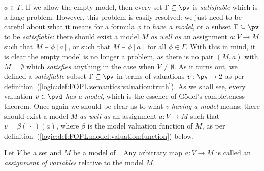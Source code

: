 $\phi\in\Gamma$. If we allow the empty model, then every set
$\Gamma\subseteq\pv$ is {\em satisfiable} which is a huge problem.
However, this problem is easily resolved: we just need to be careful
about what it means for a formula $\phi$ to {\em have a model}, or a
subset $\Gamma\subseteq\pv$ to be {\em satisfiable}: there should
exist a model $M$ {\em as well as } an assignment $a:V\to M$ such
that $M\vDash\phi[a]$, or such that $M\vDash\phi[a]$ for all
$\phi\in\Gamma$. With this in mind, it is clear the empty model is
no longer a problem, as there is no pair $(M,a)$ with $M=\emptyset$
which {\em satisfies} anything in the case when $V\neq\emptyset$. As
it turns out, we defined a {\em satisfiable} subset
$\Gamma\subseteq\pv$ in terms of valuations $v:\pv\to 2$ as per
definition~(\ref{logic:def:FOPL:semantics:valuation:truth}). As we
shall see, every valuation $v\in\pvd$ {\em has a model}, which is
the essence of G\"odel's completeness theorem. Once again we should
be clear as to what $v$ {\em having a model} means: there should
exist a model $M$ {\em as well as} an assignment $a:V\to M$ such
that $v=\beta(\,\cdot\,)(a)$, where $\beta$ is the model valuation
function of $M$, as per
definition~(\ref{logic:def:FOPL:model:valuation:function}) below.

\begin{defin}\label{logic:def:FOPL:model:assignment}
Let $V$ be a set and $M$ be a model of\, \pv. Any arbitrary map
$a:V\to M$ is called an {\em assignment of variables} relative to
the model $M$.
\end{defin}
